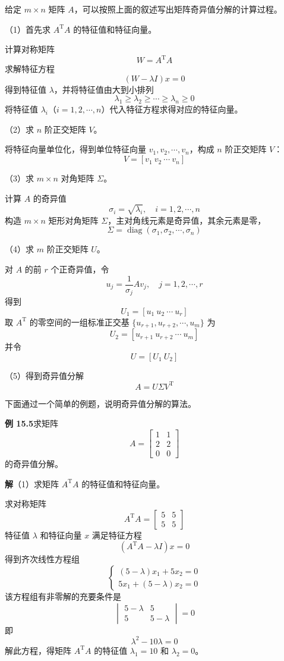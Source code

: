 \documentclass[UTF8, 12pt, fontset=fandol, oneside]{ctexart}
\begin{document}
给定 $m\times n$ 矩阵 $A$，可以按照上面的叙述写出矩阵奇异值分解的计算过程。

（1）首先求 $A^{\mathrm{T}}A$ 的特征值和特征向量。

计算对称矩阵
\[
W=A^{\mathrm{T}}A
\]
求解特征方程
\[
(W-\lambda I)x=0
\]
得到特征值 $\lambda$，并将特征值由大到小排列
\[
\lambda_1\geqslant\lambda_2\geqslant\cdots\geqslant\lambda_n\geqslant0
\]
将特征值 $\lambda_i$（$i=1,2,\cdots,n$）代入特征方程求得对应的特征向量。

（2）求 $n$ 阶正交矩阵 $V$。

将特征向量单位化，得到单位特征向量 $v_1,v_2,\cdots,v_n$，构成 $n$ 阶正交矩阵 $V$：
\[
V=[v_1\ v_2\ \cdots\ v_n]
\]

（3）求 $m\times n$ 对角矩阵 $\Sigma$。

计算 $A$ 的奇异值
\[
\sigma_i=\sqrt{\lambda_i},\quad i=1,2,\cdots,n
\]
构造 $m\times n$ 矩形对角矩阵 $\Sigma$，主对角线元素是奇异值，其余元素是零，
\[
\Sigma=\operatorname{diag}(\sigma_1,\sigma_2,\cdots,\sigma_n)
\]

（4）求 $m$ 阶正交矩阵 $U$。

对 $A$ 的前 $r$ 个正奇异值，令
\[
u_j=\frac{1}{\sigma_j}Av_j,\quad j=1,2,\cdots,r
\]
得到
\[
U_1=[u_1\ u_2\ \cdots\ u_r]
\]
取 $A^{\mathrm{T}}$ 的零空间的一组标准正交基 $\{u_{r+1},u_{r+2},\cdots,u_m\}$ 为
\[
U_2=[u_{r+1}\ u_{r+2}\ \cdots\ u_m]
\]
并令
\[
U=[U_1\ U_2]
\]

（5）得到奇异值分解
\[
A=U\Sigma V^{\mathrm{T}}
\]

下面通过一个简单的例题，说明奇异值分解的算法。

\noindent\textbf{例 15.5}\quad 求矩阵
\[
A=
\begin{bmatrix}
1&1\\
2&2\\
0&0
\end{bmatrix}
\]
的奇异值分解。

\noindent\textbf{解}\quad （1）求矩阵 $A^{\mathrm{T}}A$ 的特征值和特征向量。

求对称矩阵
\[
A^{\mathrm{T}}A=
\begin{bmatrix}
5&5\\
5&5
\end{bmatrix}
\]
特征值 $\lambda$ 和特征向量 $x$ 满足特征方程
\[
(A^{\mathrm{T}}A-\lambda I)x=0
\]
得到齐次线性方程组
\[
\begin{cases}
(5-\lambda)x_1+5x_2=0\\
5x_1+(5-\lambda)x_2=0
\end{cases}
\]
该方程组有非零解的充要条件是
\[
\begin{vmatrix}
5-\lambda&5\\
5&5-\lambda
\end{vmatrix}=0
\]
即
\[
\lambda^2-10\lambda=0
\]
解此方程，得矩阵 $A^{\mathrm{T}}A$ 的特征值 $\lambda_1=10$ 和 $\lambda_2=0$。
\end{document}

